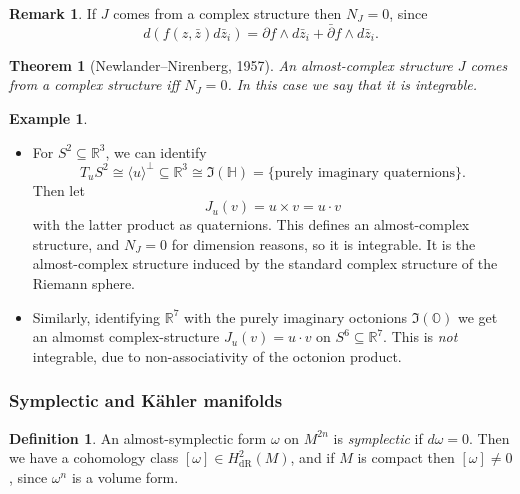 \documentclass{article}
\newtheorem*{theorem}{Theorem}
\theoremstyle{definition}
\newtheorem*{definition}{Definition}
\newtheorem*{example}{Example}
\newtheorem*{remark}{Remark}
\newcommand{\dR}{\mathrm{dR}}
\renewcommand{\H}{\mathbb{H}}
\newcommand{\bbO}{\mathbb{O}}
\newcommand{\R}{\mathbb{R}}
\begin{document}
\begin{remark}
    If $J$ comes from a complex structure then $N_J=0$, since
    \begin{equation*}
        d(f(z,\bar z)d\bar z_i)
            = \partial f\wedge d\bar z_i + \bar\partial f\wedge d\bar z_i.
    \end{equation*}
\end{remark}

\begin{theorem}[Newlander--Nirenberg, 1957]
    An almost-complex structure $J$ comes from a complex structure iff $N_J=0$.
    In this case we say that it is \emph{integrable}.
\end{theorem}

\begin{example}
    ~
    \begin{itemize}
        \item For $S^2\subseteq\R^3$, we can identify
            \begin{equation*}
                T_uS^2 \cong \langle u\rangle^\perp\subseteq\R^3
                    \cong \Im(\H) = \{\text{purely imaginary quaternions}\}.
            \end{equation*}
            Then let
            \begin{equation*}
                J_u(v) = u\times v = u\cdot v
            \end{equation*}
            with the latter product as quaternions. This defines an
            almost-complex structure, and $N_J=0$ for dimension reasons, so it
            is integrable. It is the almost-complex structure induced by the
            standard complex structure of the Riemann sphere.

        \item Similarly, identifying $\R^7$ with the purely imaginary octonions
            $\Im(\bbO)$ we get an almomst complex-structure $J_u(v)=u\cdot v$ on
            $S^6\subseteq\R^7$. This is \emph{not} integrable, due to
            non-associativity of the octonion product.
    \end{itemize}
\end{example}

\subsubsection*{Symplectic and K\"ahler manifolds}

\begin{definition}
    An almost-symplectic form $\omega$ on $M^{2n}$ is \emph{symplectic} if
    $d\omega=0$. Then we have a cohomology class $[\omega]\in H^2_\dR(M)$, and
    if $M$ is compact then $[\omega]\ne0$, since $\omega^n$ is a volume form.
\end{definition}
\end{document}
